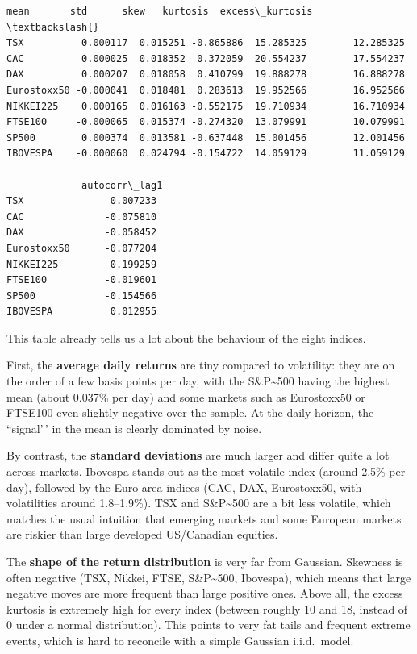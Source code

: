 \documentclass[11pt]{article}
\begin{document}
            \begin{tcolorbox}[breakable, size=fbox, boxrule=.5pt, pad at break*=1mm, opacityfill=0]
\begin{Verbatim}[commandchars=\\\{\}]
                 mean       std      skew   kurtosis  excess\_kurtosis  \textbackslash{}
TSX          0.000117  0.015251 -0.865886  15.285325        12.285325
CAC          0.000025  0.018352  0.372059  20.554237        17.554237
DAX          0.000207  0.018058  0.410799  19.888278        16.888278
Eurostoxx50 -0.000041  0.018481  0.283613  19.952566        16.952566
NIKKEI225    0.000165  0.016163 -0.552175  19.710934        16.710934
FTSE100     -0.000065  0.015374 -0.274320  13.079991        10.079991
SP500        0.000374  0.013581 -0.637448  15.001456        12.001456
IBOVESPA    -0.000060  0.024794 -0.154722  14.059129        11.059129

             autocorr\_lag1
TSX               0.007233
CAC              -0.075810
DAX              -0.058452
Eurostoxx50      -0.077204
NIKKEI225        -0.199259
FTSE100          -0.019601
SP500            -0.154566
IBOVESPA          0.012955
\end{Verbatim}
\end{tcolorbox}
        
    This table already tells us a lot about the behaviour of the eight
indices.

First, the \textbf{average daily returns} are tiny compared to
volatility: they are on the order of a few basis points per day, with
the S\&P\textasciitilde500 having the highest mean (about 0.037\% per
day) and some markets such as Eurostoxx50 or FTSE100 even slightly
negative over the sample. At the daily horizon, the ``signal'\,' in the
mean is clearly dominated by noise.

By contrast, the \textbf{standard deviations} are much larger and differ
quite a lot across markets. Ibovespa stands out as the most volatile
index (around 2.5\% per day), followed by the Euro area indices (CAC,
DAX, Eurostoxx50, with volatilities around 1.8--1.9\%). TSX and
S\&P\textasciitilde500 are a bit less volatile, which matches the usual
intuition that emerging markets and some European markets are riskier
than large developed US/Canadian equities.

The \textbf{shape of the return distribution} is very far from Gaussian.
Skewness is often negative (TSX, Nikkei, FTSE, S\&P\textasciitilde500,
Ibovespa), which means that large negative moves are more frequent than
large positive ones. Above all, the excess kurtosis is extremely high
for every index (between roughly 10 and 18, instead of 0 under a normal
distribution). This points to very fat tails and frequent extreme
events, which is hard to reconcile with a simple Gaussian i.i.d.~model.
\end{document}
